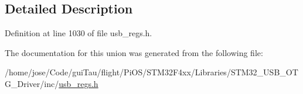 \subsection{Detailed Description}


Definition at line 1030 of file usb\-\_\-regs.\-h.



The documentation for this union was generated from the following file\-:\begin{DoxyCompactItemize}
\item 
/home/jose/\-Code/gui\-Tau/flight/\-Pi\-O\-S/\-S\-T\-M32\-F4xx/\-Libraries/\-S\-T\-M32\-\_\-\-U\-S\-B\-\_\-\-O\-T\-G\-\_\-\-Driver/inc/\hyperlink{_s_t_m32_f4xx_2_libraries_2_s_t_m32___u_s_b___o_t_g___driver_2inc_2usb__regs_8h}{usb\-\_\-regs.\-h}\end{DoxyCompactItemize}

